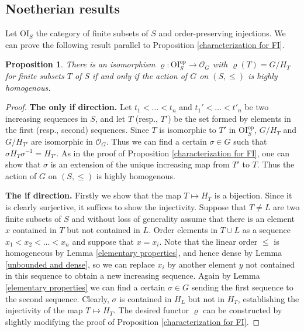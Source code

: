 \documentclass[11pt, reqno]{amsart}
\theoremstyle{plain}
\newtheorem{proposition}[theorem]{Proposition}
\numberwithin{equation}{section}
\theoremstyle{definition}
\newcommand{\OI}{{\mathrm{OI}}}
\newcommand{\op}{{\mathrm{op}}}
\begin{document}
\subsection{Noetherian results}

Let $\OI_S$ the category of finite subsets of $S$ and order-preserving injections. We can prove the following result parallel to Proposition \ref{characterization for FI}.

\begin{proposition} \label{characterization of OI}
There is an isomorphism $\varrho: \OI_S^{\op} \to \mathcal{O}_G$ with $\varrho(T) = G/H_T$ for finite subsets $T$ of $S$ if and only if the action of $G$ on $(S, \leqslant)$ is highly homogenous.
\end{proposition}

\begin{proof}
\textbf{The only if direction.} Let $t_1 < \ldots < t_n$ and $t_1' < \ldots < t'_n$ be two increasing sequences in $S$, and let $T$ (resp., $T'$) be the set formed by elements in the first (resp., second) sequences. Since $T$ is isomorphic to $T'$ in $\OI_S^{\op}$, $G/H_T$ and $G/H_{T'}$ are isomorphic in $\mathcal{O}_G$. Thus we can find a certain $\sigma \in G$ such that $\sigma H_T \sigma^{-1} = H_{T'}$. As in the proof of Proposition \ref{characterization for FI}, one can show that $\sigma$ is an extension of the unique increasing map from $T'$ to $T$. Thus the action of $G$ on $(S, \leqslant)$ is highly homogenous.

\textbf{The if direction.} Firstly we show that the map $T \mapsto H_T$ is a bijection. Since it is clearly surjective, it suffices to show the injectivity. Suppose that $T \neq L$ are two finite subsets of $S$ and without loss of generality assume that there is an element $x$ contained in $T$ but not contained in $L$. Order elements in $T \cup L$ as a sequence $x_1 < x_2 < \ldots < x_n$ and suppose that $x = x_i$. Note that the linear order $\leqslant$ is homogeneous by Lemma \ref{elementary properties}, and hence dense by Lemma \ref{unbounded and dense}, so we can replace $x_i$ by another element $y$ not contained in this sequence to obtain a new increasing sequence. Again by Lemma \ref{elementary properties} we can find a certain $\sigma \in G$ sending the first sequence to the second sequence. Clearly, $\sigma$ is contained in $H_L$ but not in $H_T$, establishing the injectivity of the map $T \mapsto H_T$. The desired functor $\varrho$ can be constructed by slightly modifying the proof of Proposition \ref{characterization for FI}.
\end{proof}
\end{document}

